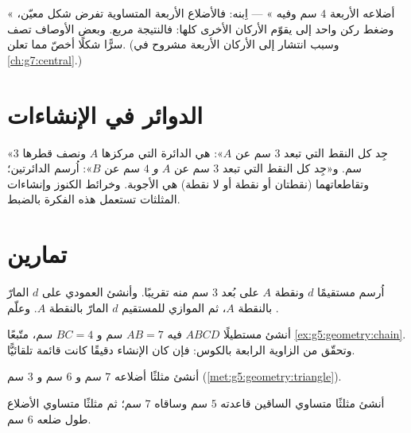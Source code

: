 \begin{example}\label{ex:g5:geometry:recognize}
« أضلاعه الأربعة $4$ سم وفيه » ---
اِبنه: فالأضلاع الأربعة المتساوية تفرض شكل معيّن، وضغط
ركن واحد إلى  يقوّم الأركان الأخرى كلها: فالنتيجة
مربع. وبعض الأوصاف تصف سرًّا شكلًا أخصّ مما
تعلن. (وسبب انتشار  إلى الأركان الأربعة
مشروح في \cref{ch:g7:central}.)
\end{example}

\section{الدوائر في الإنشاءات}

\begin{example}\label{ex:g5:geometry:circle}
«جِد كل النقط التي تبعد $3$ سم عن $A$»: هي الدائرة التي مركزها $A$
ونصف قطرها $3$ سم. و«جِد كل النقط التي تبعد $3$ سم عن $A$ \emph{و}
$4$ سم عن $B$»: اُرسم الدائرتين؛ وتقاطعاتهما (نقطتان أو نقطة
أو لا نقطة) هي الأجوبة. وخرائط الكنوز وإنشاءات المثلثات
تستعمل هذه الفكرة بالضبط.
\end{example}

\section{تمارين}

\begin{exercise}[$\star$]\label{exo:g5:geometry:1}
اُرسم مستقيمًا $d$ ونقطة $A$ على بُعد $3$ سم منه تقريبًا. وأنشئ
العمودي على $d$ المارّ بالنقطة $A$، ثم الموازي للمستقيم $d$
المارّ بالنقطة $A$. وعلّم .
\end{exercise}

\begin{exercise}[$\star$]\label{exo:g5:geometry:2}
أنشئ مستطيلًا $ABCD$ فيه $AB = 7$ سم و $BC = 4$ سم،
متّبعًا \cref{ex:g5:geometry:chain}. وتحقّق من الزاوية الرابعة
بالكوس: فإن كان الإنشاء دقيقًا كانت قائمة
تلقائيًّا.
\end{exercise}

\begin{exercise}[$\star$]\label{exo:g5:geometry:3}
أنشئ مثلثًا أضلاعه $7$ سم و $6$ سم و $3$ سم
(\cref{met:g5:geometry:triangle}).
\end{exercise}

\begin{exercise}[$\star$]\label{exo:g5:geometry:4}
أنشئ مثلثًا متساوي الساقين قاعدته $5$ سم وساقاه
$7$ سم؛ ثم مثلثًا متساوي الأضلاع طول ضلعه $6$ سم.
\end{exercise}


